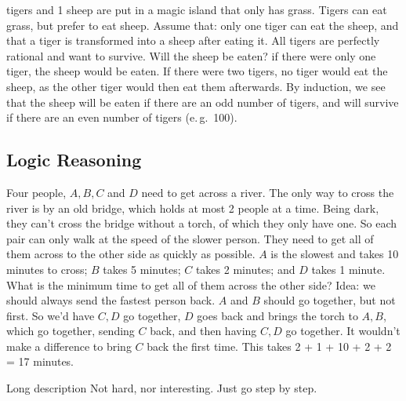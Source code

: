 \begin{qanda}
     tigers and 1 sheep are put in a magic island that only has grass.
    Tigers can eat grass, but prefer to eat sheep.
    Assume that: only one tiger can eat the sheep, and that a tiger is transformed into a sheep after eating it.
    All tigers are perfectly rational and want to survive. Will the sheep be eaten?
    \A if there were only one tiger, the sheep would be eaten.
    If there were two tigers, no tiger would eat the sheep, as the other tiger would then eat them afterwards.
    By induction, we see that the sheep will be eaten if there are an odd number of tigers, and will survive if there are an even number of tigers (e.\,g.\ 100).
\end{qanda}


\subsection{Logic Reasoning}

\begin{qanda}
    \Q 
    Four people, $A, B, C$ and $D$ need to get across a river. The only way to cross the river is by an old bridge, which holds at most 2 people at a time. 
    Being dark, they can't cross the bridge without a torch, of which they only have one.
    So each pair can only walk at the speed of the slower person.
    They need to get all of them across to the other side as quickly as possible.
    $A$ is the slowest and takes 10 minutes to cross; $B$ takes 5 minutes; $C$ takes 2 minutes; and $D$ takes 1 minute. 
    What is the minimum time to get all of them across the other side?
    \A
    Idea: we should always send the fastest person back. 
    $A$ and $B$ should go together, but not first.
    So we'd have $C, D$ go together, $D$ goes back and brings the torch to $A, B$, which go together, sending $C$ back, and then having $C, D$ go together.
    It wouldn't make a difference to bring $C$ back the first time.
    This takes 2 + 1 + 10 + 2 + 2 = 17 minutes.
\end{qanda}

\begin{qanda}
  \Q Long description
  \A Not hard, nor interesting. Just go step by step.
\end{qanda}

